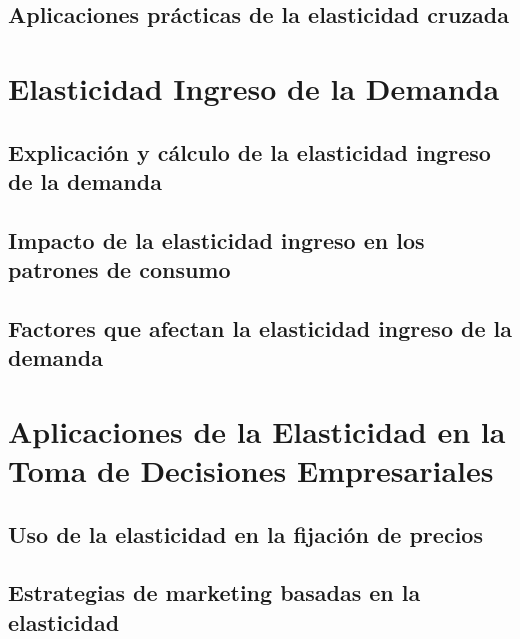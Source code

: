 \documentclass[
  jou,
  floatsintext,
  longtable,
  a4paper,
  nolmodern,
  notxfonts,
  notimes,
  colorlinks=true,linkcolor=blue,citecolor=blue,urlcolor=blue]{apa7}
\begin{document}
\subsection{Aplicaciones prácticas de la elasticidad
cruzada}\label{aplicaciones-pruxe1cticas-de-la-elasticidad-cruzada}

\section{Elasticidad Ingreso de la
Demanda}\label{elasticidad-ingreso-de-la-demanda}

\subsection{Explicación y cálculo de la elasticidad ingreso de la
demanda}\label{explicaciuxf3n-y-cuxe1lculo-de-la-elasticidad-ingreso-de-la-demanda}

\subsection{Impacto de la elasticidad ingreso en los patrones de
consumo}\label{impacto-de-la-elasticidad-ingreso-en-los-patrones-de-consumo}

\subsection{Factores que afectan la elasticidad ingreso de la
demanda}\label{factores-que-afectan-la-elasticidad-ingreso-de-la-demanda}

\section{Aplicaciones de la Elasticidad en la Toma de Decisiones
Empresariales}\label{aplicaciones-de-la-elasticidad-en-la-toma-de-decisiones-empresariales}

\subsection{Uso de la elasticidad en la fijación de
precios}\label{uso-de-la-elasticidad-en-la-fijaciuxf3n-de-precios}

\subsection{Estrategias de marketing basadas en la
elasticidad}\label{estrategias-de-marketing-basadas-en-la-elasticidad}
\end{document}
